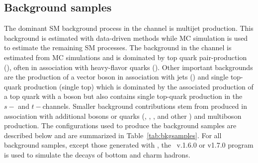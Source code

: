 \subsection{Background samples}
\label{sec:samples:bkg}
The dominant SM background process in the \allhad channel is multijet production. This background is estimated with data-driven methods while MC simulation is used to estimate the remaining SM processes. The background in the \onelep channel is estimated from MC simulations and is dominated by top quark pair-production (\ttbar), often in association with heavy-flavor quarks (\ttHF). Other important backgrounds are the production of a vector boson in association with jets (\Vjets) and single top-quark production (single top) which is dominated by the associated production of a top quark with a \Wboson boson but also contains single top-quark production in the $s-$ and $t-$channels. Smaller background contributions stem from \ttbar produced in association with additional bosons or quarks (\tttt, \ttV, \ttH, and other \ttX) and multiboson production. 
The configurations used to produce the background samples are described below and are summarized in Table~\ref{tab:bkgsamples}. For all background samples, except those generated with \sherpa, the \evtgen\ v.1.6.0 or v1.7.0 program is used to simulate the decays of bottom and charm hadrons.

\begin{table}[tbp]
  \caption{Overview of the configuration of all nominal background samples used in the analysis; details and definitions are provided in the text.}%
  \label{tab:bkgsamples}
  \centering
\end{table}

